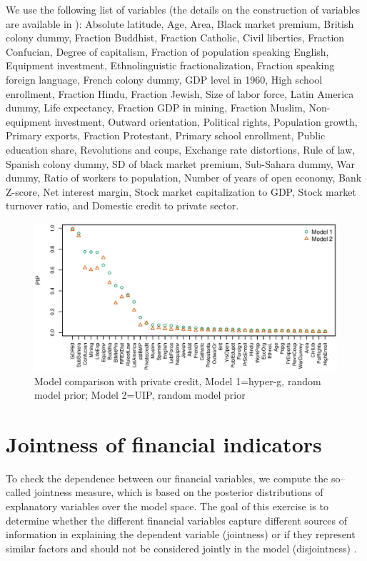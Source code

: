 \begin{subappendices}
We use the following list of variables (the details on the construction of variables are available in \citet{Fernandezetal2001}): Absolute latitude, Age, Area, Black market premium, British colony dummy, Fraction Buddhist, Fraction Catholic, Civil liberties, Fraction Confucian, Degree of capitalism, Fraction of population speaking English, Equipment investment, Ethnolinguistic fractionalization, Fraction speaking foreign language, French colony dummy, GDP level in 1960, High school enrollment, Fraction Hindu, Fraction Jewish, Size of labor force, Latin America dummy, Life expectancy, Fraction GDP in mining, Fraction Muslim, Non-equipment investment, Outward orientation, Political rights, Population growth, Primary exports, Fraction Protestant, Primary school enrollment, Public education share, Revolutions and coups, Exchange rate distortions, Rule of law, Spanish colony dummy, SD of black market premium, Sub-Sahara dummy, War dummy, Ratio of workers to population, Number of years of open economy, Bank Z-score, Net interest margin, Stock market capitalization to GDP, Stock market turnover ratio, and Domestic credit to private sector.

\begin{figure}[!ht]
	\begin{center}
		\includegraphics[width=\linewidth]{Figures/ch2/plotCompPC6011rnd}
		\caption{Model comparison with private credit, Model 1=hyper-g, random model prior; Model 2=\ac{UIP}, random model prior}
		\label{ch2fig:compPCrnd}
	\end{center}
\end{figure}
%

\section{Jointness of financial indicators}\label{ch2app:joint}
To check the dependence between our financial variables, we compute the so--called jointness measure, which is based on the posterior distributions of explanatory variables over the model space. The goal of this exercise is to determine whether the different financial variables capture different sources of information in explaining the dependent variable (jointness) or if they represent similar factors and should not be considered jointly in the model (disjointness) \citep{leysteel2007}.


\end{subappendices}
